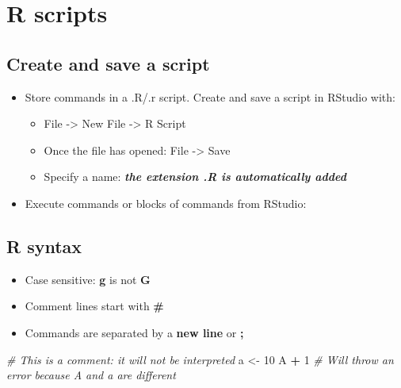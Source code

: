 \documentclass[]{book}
\newenvironment{Shaded}{\begin{snugshade}}{\end{snugshade}}
\newcommand{\CommentTok}[1]{\textcolor[rgb]{0.56,0.35,0.01}{\textit{#1}}}
\newcommand{\DecValTok}[1]{\textcolor[rgb]{0.00,0.00,0.81}{#1}}
\newcommand{\NormalTok}[1]{#1}
\newcommand{\OperatorTok}[1]{\textcolor[rgb]{0.81,0.36,0.00}{\textbf{#1}}}
\newcommand{\StringTok}[1]{\textcolor[rgb]{0.31,0.60,0.02}{#1}}
\providecommand{\tightlist}{%
  \setlength{\itemsep}{0pt}\setlength{\parskip}{0pt}}
\begin{document}
\hypertarget{r-scripts}{%
\chapter{R scripts}\label{r-scripts}}

\hypertarget{create-and-save-a-script}{%
\section{Create and save a script}\label{create-and-save-a-script}}

\begin{itemize}
\tightlist
\item
  Store commands in a .R/.r script. Create and save a script in RStudio with:

  \begin{itemize}
  \tightlist
  \item
    File -\textgreater{} New File -\textgreater{} R Script
  \item
    Once the file has opened: File -\textgreater{} Save
  \item
    Specify a name: \textbf{\emph{the extension .R is automatically added}}
  \end{itemize}
\item
  Execute commands or blocks of commands from RStudio:
\end{itemize}

\hypertarget{r-syntax}{%
\section{R syntax}\label{r-syntax}}

\begin{itemize}
\tightlist
\item
  Case sensitive: \textbf{g} is not \textbf{G}
\item
  Comment lines start with \textbf{\#}
\item
  Commands are separated by a \textbf{new line} or \textbf{;}
\end{itemize}

\begin{Shaded}
\begin{Highlighting}[]
\CommentTok{# This is a comment: it will not be interpreted}
\NormalTok{a <-}\StringTok{ }\DecValTok{10}
\NormalTok{A }\OperatorTok{+}\StringTok{ }\DecValTok{1}
\CommentTok{# Will throw an error because A and a are different}
\end{Highlighting}
\end{Shaded}
\end{document}
